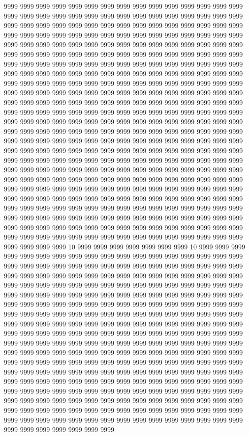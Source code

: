 9999 9999 9999 9999 9999 9999 9999 9999 9999 9999 9999 9999 9999 9999 9999 9999 9999 9999 9999 9999 9999 9999 9999 9999 9999 9999 9999 9999 9999 9999 9999 9999 9999 9999 9999 9999 9999 9999 9999 9999 9999 9999 9999 9999 9999 9999 9999 9999 9999 9999 9999 9999 9999 9999 9999 9999 9999 9999 9999 9999 9999 9999 9999 9999 9999 9999 9999 9999 9999 9999 9999 9999 9999 9999 9999 9999 9999 9999 9999 9999 9999 9999 9999 9999 9999 9999 9999 9999 9999 9999 9999 9999 9999 9999 9999 9999 9999 9999 9999 9999 9999 9999 9999 9999 9999 9999 9999 9999 9999 9999 9999 9999 9999 9999 9999 9999 9999 9999 9999 9999 9999 9999 9999 9999 9999 9999 9999 9999 9999 9999 9999 9999 9999 9999 9999 9999 9999 9999 9999 9999 9999 9999 9999 9999 9999 9999 9999 9999 9999 9999 9999 9999 9999 9999 9999 9999 9999 9999 9999 9999 9999 9999 9999 9999 9999 9999 9999 9999 9999 9999 9999 9999 9999 9999 9999 9999 9999 9999 9999 9999 9999 9999 9999 9999 9999 9999 9999 9999 9999 9999 9999 9999 9999 9999 9999 9999 9999 9999 9999 9999 9999 9999 9999 9999 9999 9999 9999 9999 9999 9999 9999 9999 9999 9999 9999 9999 9999 9999 9999 9999 9999 9999 9999 9999 9999 9999 9999 9999 9999 9999 9999 9999 9999 9999 9999 9999 9999 9999 9999 9999 9999 9999 9999 9999 9999 9999 9999 9999 9999 9999 9999 9999 9999 9999 9999 9999 9999 9999 9999 9999 9999 9999 9999 9999 9999 9999 9999 9999 9999 9999 9999 9999 9999 9999 9999 9999 9999 9999 9999 9999 9999 9999 9999 9999 9999 9999 9999 9999 9999 9999 9999 9999 9999 9999 9999 9999 9999 9999 9999 9999 9999 9999 9999 9999 9999 9999 9999 9999 9999 9999 9999 9999 9999 9999 9999 9999 9999 9999 9999 9999 9999 9999 9999 9999 9999 9999 9999 9999 9999 9999 9999 9999 9999 9999 9999 9999 9999 9999 9999 9999 9999 9999 9999 9999 9999 9999 9999 9999 9999 9999 9999 9999 9999 9999 9999 9999 9999 9999 9999 9999 9999 9999 9999 9999 9999 9999 9999 9999 9999 9999 9999 9999 9999 9999 9999 9999 9999 9999 9999 10 9999 9999 9999 9999 9999 9999 9999 10 9999 9999 9999 9999 9999 9999 9999 9999 9999 9999 9999 9999 9999 9999 9999 9999 9999 9999 9999 9999 9999 9999 9999 9999 9999 9999 9999 9999 9999 9999 9999 9999 9999 9999 9999 9999 9999 9999 9999 9999 9999 9999 9999 9999 9999 9999 9999 9999 9999 9999 9999 9999 9999 9999 9999 9999 9999 9999 9999 9999 9999 9999 9999 9999 9999 9999 9999 9999 9999 9999 9999 9999 9999 9999 9999 9999 9999 9999 9999 9999 9999 9999 9999 9999 9999 9999 9999 9999 9999 9999 9999 9999 9999 9999 9999 9999 9999 9999 9999 9999 9999 9999 9999 9999 9999 9999 9999 9999 9999 9999 9999 9999 9999 9999 9999 9999 9999 9999 9999 9999 9999 9999 9999 9999 9999 9999 9999 9999 9999 9999 9999 9999 9999 9999 9999 9999 9999 9999 9999 9999 9999 9999 9999 9999 9999 9999 9999 9999 9999 9999 9999 9999 9999 9999 9999 9999 9999 9999 9999 9999 9999 9999 9999 9999 9999 9999 9999 9999 9999 9999 9999 9999 9999 9999 9999 9999 9999 9999 9999 9999 9999 9999 9999 9999 9999 9999 9999 9999 9999 9999 9999 9999 9999 9999 9999 9999 9999 9999 9999 9999 9999 9999 9999 9999 9999 9999 9999 9999 9999 9999 9999 9999 9999 9999 9999 9999 9999 9999 9999 9999 9999 9999 9999 9999 9999 9999 9999 9999 9999 9999 9999 9999 9999 9999 9999 9999 9999 9999 9999 9999 9999 9999 9999 9999 9999 9999 9999 9999 9999 9999 9999 9999 9999 9999 9999 9999 9999 9999 9999 9999 9999 9999 9999 9999 9999 9999 9999 9999 9999 9999 9999 9999 9999 9999 9999 9999 9999 9999 9999 9999 